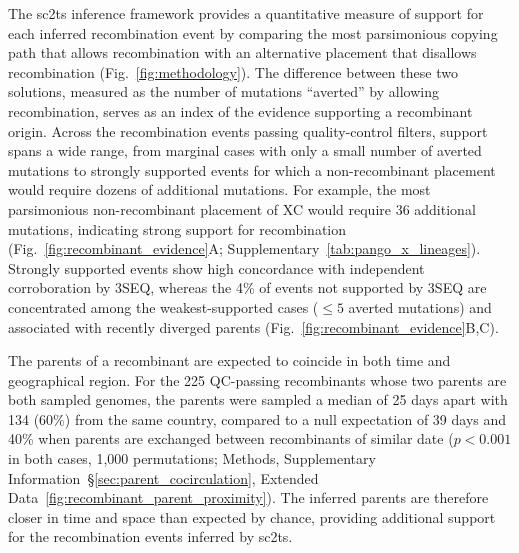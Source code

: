 \documentclass[12pt]{article}
\newcommand{\supref}[1]{Supplementary Information~\S\ref{#1}}
\newcommand{\figref}[1]{Fig.~\ref{#1}}
\newcommand{\edref}[1]{Extended Data~\ref{#1}}
\newcommand{\siref}[1]{Supplementary~\ref{#1}}
\begin{document}
The sc2ts inference framework provides a quantitative measure of support for
each inferred recombination event by comparing the most parsimonious copying
path that allows recombination with an alternative placement that disallows
recombination (\figref{fig:methodology}).
The difference between these two solutions, measured as the
number of mutations ``averted'' by allowing recombination, serves as an index of
the evidence supporting a recombinant origin.
Across the recombination events
passing quality-control filters, support spans a wide range, from marginal
cases with only a small number of averted mutations to strongly supported
events for which a non-recombinant placement would require dozens of additional
mutations. For example, the most parsimonious non-recombinant placement of XC
would require 36 additional mutations, indicating strong support for
recombination (\figref{fig:recombinant_evidence}A;
\siref{tab:pango_x_lineages}).
Strongly supported events show high concordance with independent corroboration by
3SEQ, whereas the 4\% of events not supported by 3SEQ are
concentrated among the weakest-supported cases ($\leq 5$ averted mutations)
and associated with recently diverged parents
(\figref{fig:recombinant_evidence}B,C).

The parents of a recombinant are expected to coincide in both time and geographical region.
For the 225 QC-passing recombinants whose two parents are both sampled genomes,
the parents were sampled a median of 25 days apart
with 134 (60\%) from the same country,
compared to a null expectation of 39 days and 40\% when parents are exchanged
between recombinants of similar date
($p < 0.001$ in both cases, 1,000 permutations;
Methods, \supref{sec:parent_cocirculation},
\edref{fig:recombinant_parent_proximity}).
The inferred parents are therefore closer in time and space
than expected by chance, providing additional support
for the recombination events inferred by sc2ts.
\end{document}
